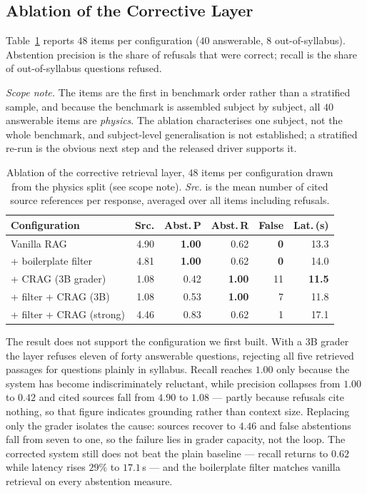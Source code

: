\documentclass[conference]{IEEEtran}
\begin{document}
\subsection{Ablation of the Corrective Layer}
\label{sec:ablation}
Table~\ref{tab:ablation} reports $48$ items per configuration ($40$ answerable,
$8$ out-of-syllabus). Abstention precision is the share of refusals that were
correct; recall is the share of out-of-syllabus questions refused.

\textit{Scope note.} The items are the first in benchmark order rather than a
stratified sample, and because the benchmark is assembled subject by subject,
all $40$ answerable items are \emph{physics}. The ablation characterises one
subject, not the whole benchmark, and subject-level generalisation is not
established; a stratified re-run is the obvious next step and the released
driver supports it.

\begin{table}[htbp]
\caption{Ablation of the corrective retrieval layer, $48$ items per
configuration drawn from the physics split (see scope note).
\emph{Src.} is the mean number of cited source references per response,
averaged over all items including refusals.}
\label{tab:ablation}
\centering
\begin{tabular}{lrrrrr}
\toprule
\textbf{Configuration} & \textbf{Src.} & \textbf{Abst.\,P} & \textbf{Abst.\,R} & \textbf{False} & \textbf{Lat.\,(s)} \\
\midrule
Vanilla RAG              & 4.90 & \textbf{1.00} & 0.62 & \textbf{0}  & 13.3 \\
+ boilerplate filter     & 4.81 & \textbf{1.00} & 0.62 & \textbf{0}  & 14.0 \\
+ CRAG ($3$B grader)     & 1.08 & 0.42 & \textbf{1.00} & 11 & \textbf{11.5} \\
+ filter + CRAG ($3$B)   & 1.08 & 0.53 & \textbf{1.00} & 7  & 11.8 \\
+ filter + CRAG (strong) & 4.46 & 0.83 & 0.62 & 1  & 17.1 \\
\bottomrule
\end{tabular}
\end{table}

The result does not support the configuration we first built. With a $3$B
grader the layer refuses eleven of forty answerable questions, rejecting all
five retrieved passages for questions plainly in syllabus. Recall reaches
$1.00$ only because the system has become indiscriminately reluctant, while
precision collapses from $1.00$ to $0.42$ and cited sources fall from $4.90$ to
$1.08$ --- partly because refusals cite nothing, so that figure indicates
grounding rather than context size. Replacing only the grader isolates the
cause: sources recover to $4.46$ and false abstentions fall from seven to one,
so the failure lies in grader capacity, not the loop. The corrected system
still does not beat the plain baseline --- recall returns to $0.62$ while
latency rises $29\%$ to $17.1$\,s --- and the boilerplate filter matches vanilla
retrieval on every abstention measure.
\end{document}
